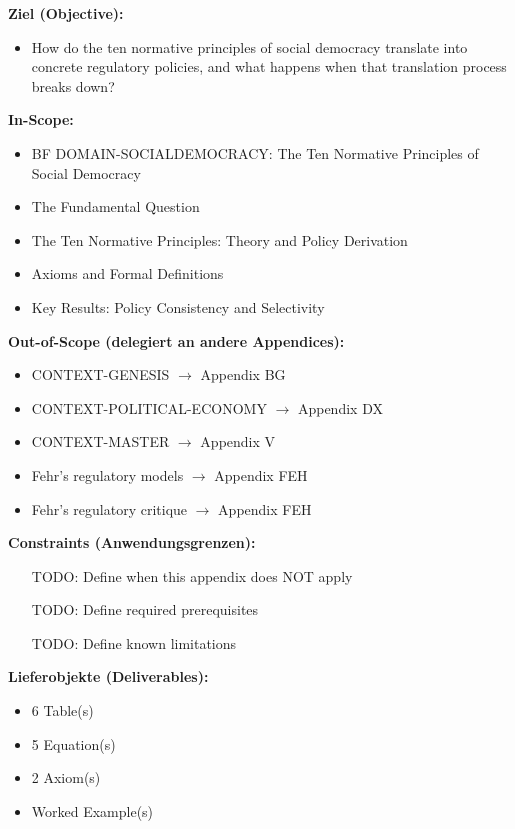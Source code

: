 \begin{tcolorbox}[
    colback=orange!5!white,
    colframe=orange!75!black,
    title={\textbf{Appendix Scope: Ziel / In-Scope / Out-of-Scope / Constraints}},
    fonttitle=\bfseries
]

\textbf{Ziel (Objective):}
\begin{itemize}[nosep]
    \item How do the ten normative principles of social democracy translate into concrete regulatory policies, and what happens when that translation process breaks down?
\end{itemize}

\textbf{In-Scope:}
\begin{itemize}[nosep]
    \item BF DOMAIN-SOCIALDEMOCRACY: The Ten Normative Principles of Social Democracy
    \item The Fundamental Question
    \item The Ten Normative Principles: Theory and Policy Derivation
    \item Axioms and Formal Definitions
    \item Key Results: Policy Consistency and Selectivity
\end{itemize}

\textbf{Out-of-Scope (delegiert an andere Appendices):}
\begin{itemize}[nosep]
    \item CONTEXT-GENESIS $\rightarrow$ Appendix BG
    \item CONTEXT-POLITICAL-ECONOMY $\rightarrow$ Appendix DX
    \item CONTEXT-MASTER $\rightarrow$ Appendix V
    \item Fehr's regulatory models $\rightarrow$ Appendix FEH
    \item Fehr's regulatory critique $\rightarrow$ Appendix FEH
\end{itemize}

\textbf{Constraints (Anwendungsgrenzen):}
\begin{itemize}[nosep]
    \item [TODO: Define when this appendix does NOT apply]
    \item [TODO: Define required prerequisites]
    \item [TODO: Define known limitations]
\end{itemize}

\textbf{Lieferobjekte (Deliverables):}
\begin{itemize}[nosep]
    \item 6 Table(s)
    \item 5 Equation(s)
    \item 2 Axiom(s)
    \item Worked Example(s)
\end{itemize}

\end{tcolorbox}


